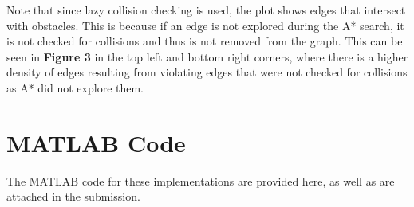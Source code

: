 \documentclass{article}
\begin{document}
Note that since lazy collision checking is used, the plot shows edges that intersect with obstacles.
This is because if an edge is not explored during the A* search, it is not checked for collisions and thus
is not removed from the graph. This can be seen in \textbf{Figure 3} in the top left and bottom right corners,
where there is a higher density of edges resulting from violating edges that were not checked for collisions
as A* did not explore them.

\section{MATLAB Code}

The MATLAB code for these implementations are provided here, as well as are attached in the submission.


\end{document}
